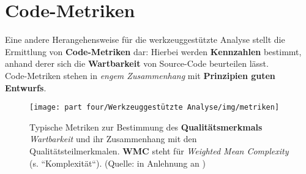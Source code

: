 \section{Code-Metriken}

\begin{tcolorbox}[title=Code-Metriken]
    Eine andere Herangehensweise für die werkzeuggestützte Analyse stellt die Ermittlung von \textbf{Code-Metriken} dar: Hierbei werden \textbf{Kennzahlen} bestimmt, anhand derer sich die \textbf{Wartbarkeit} von Source-Code beurteilen lässt.\\
    Code-Metriken stehen in \textit{engem Zusammenhang} mit \textbf{Prinzipien guten Entwurfs}.
\end{tcolorbox}
\vspace{2mm}

\begin{figure}
    \centering
    \texttt{[image: part four/Werkzeuggestützte Analyse/img/metriken]}
    \caption{Typische Metriken zur Bestimmung des \textbf{Qualitätsmerkmals} \textit{Wartbarkeit} und ihr Zusammenhang mit den Qualitätsteilmerkmalen. \textbf{WMC} steht für  \textit{Weighted Mean Complexity} (s. ``Komplexität``). (Quelle: in Anlehnung an \cite[Abb. 4.3, 37]{Wed09c})}
    \label{fig:metriken-cc}
\end{figure}